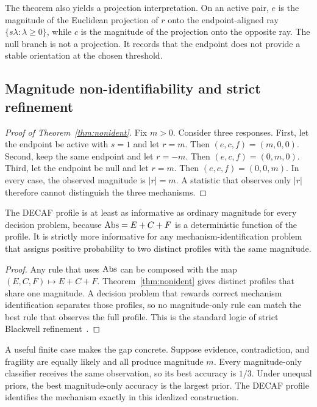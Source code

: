 The theorem also yields a projection interpretation. On an active pair, $e$ is the magnitude of the Euclidean projection of $r$ onto the endpoint-aligned ray $\{s\lambda:\lambda\geq0\}$, while $c$ is the magnitude of the projection onto the opposite ray. The null branch is not a projection. It records that the endpoint does not provide a stable orientation at the chosen threshold.

\subsection{Magnitude non-identifiability and strict refinement}

\begin{proof}[Proof of Theorem~\ref{thm:nonident}]
Fix $m>0$. Consider three responses. First, let the endpoint be active with $s=1$ and let $r=m$. Then $(e,c,f)=(m,0,0)$. Second, keep the same endpoint and let $r=-m$. Then $(e,c,f)=(0,m,0)$. Third, let the endpoint be null and let $r=m$. Then $(e,c,f)=(0,0,m)$. In every case, the observed magnitude is $|r|=m$. A statistic that observes only $|r|$ therefore cannot distinguish the three mechanisms.
\end{proof}

\begin{corollary}
\label{cor:strict-refinement}
The DECAF profile is at least as informative as ordinary magnitude for every decision problem, because $\mathrm{Abs}=E+C+F$ is a deterministic function of the profile. It is strictly more informative for any mechanism-identification problem that assigns positive probability to two distinct profiles with the same magnitude.
\end{corollary}

\begin{proof}
Any rule that uses $\mathrm{Abs}$ can be composed with the map $(E,C,F)\mapsto E+C+F$. Theorem~\ref{thm:nonident} gives distinct profiles that share one magnitude. A decision problem that rewards correct mechanism identification separates those profiles, so no magnitude-only rule can match the best rule that observes the full profile. This is the standard logic of strict Blackwell refinement~\citep{blackwell1953equivalent}.
\end{proof}

A useful finite case makes the gap concrete. Suppose evidence, contradiction, and fragility are equally likely and all produce magnitude $m$. Every magnitude-only classifier receives the same observation, so its best accuracy is $1/3$. Under unequal priors, the best magnitude-only accuracy is the largest prior. The DECAF profile identifies the mechanism exactly in this idealized construction.

